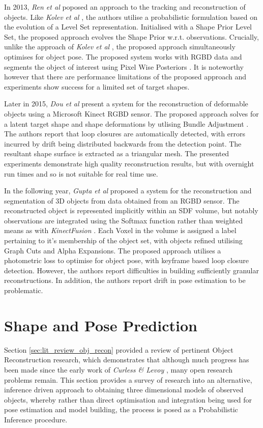 In 2013, \textit{Ren et al} \cite{Ren2013} poposed an approach to the tracking and reconstruction of 
objects. Like \textit{Kolev et al} \cite{Kolev2006}, the authors utilise a probabilistic formulation 
based on the evolution of a Level Set representation. Initialised with a Shape Prior Level Set, the 
proposed approach evolves the Shape Prior w.r.t. observations. Crucially, unlike the approach of 
\textit{Kolev et al} \cite{Kolev2006}, the proposed approach simultaneously optimises for object pose.
The proposed system works with RGBD data and segments the object of interest using Pixel Wise Posteriors 
\cite{Bibby2008}. It is noteworthy however that there are performance limitations of the proposed approach 
and experiments show success for a limited set of target shapes.

Later in 2015, \textit{Dou et al} \cite{Dou2015} present a system for the reconstruction of deformable 
objects using a Microsoft Kinect RGBD sensor. The proposed approach solves for a latent target shape 
and shape deformations by utlising Bundle Adjustment \cite{BA}. The authors report that loop closures 
are automatically detected, with errors incurred by drift being distributed backwards from the detection 
point. The resultant shape surface is extracted as a triangular mesh. The presented experiments demonstrate 
high quality reconstruction results, but with overnight run times and so is not suitable for real time use.

In the following year, \textit{Gupta et al} \cite{Gupta2016} proposed a system for the reconstruction and 
segmentation of 3D objects from data obtained from an RGBD sensor. The reconstructed object is represented 
implicitly within an SDF volume, but notably observations are integrated using the Softmax function rather 
than weighted means as with \textit{KinectFusion} \cite{Newcombe2011}. Each Voxel in the volume is 
assigned a label pertaining to it's membership of the object set, with objects refined utilising Graph 
Cuts and Alpha Expansions. The proposed approach utilises a photometric loss to optimise for object pose, 
with keyframe based loop closure detection. However, the authors report difficulties in building 
sufficiently granular reconstructions. In addition, the authors report drift in pose estimation to be 
problematic.

\section{Shape and Pose Prediction}
\label{sec:lit_review_prediction}
Section \ref{sec:lit_review_obj_recon} provided a review of pertinent Object Reconstruction research, 
which demonstrates that although much progress has been made since the early work of \textit{Curless \& 
Levoy} \cite{Curless1996}, many open research problems remain. This section provides a survey of research 
into an alternative, inference driven approach to obtaining three dimensional models of observed 
objects, whereby rather than direct optimisation and integration being used for pose estimation and 
model building, the process is posed as a Probabilistic Inference procedure.

